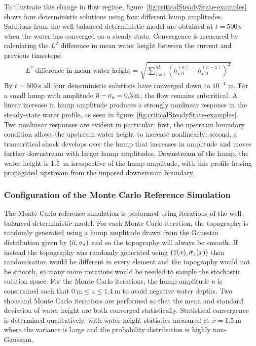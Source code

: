 To illustrate this change in flow regime, figure~\ref{fig:criticalSteadyState-examples} shows four deterministic solutions using four different hump amplitudes.
Solutions from the well-balanced deterministic model are obtained at $t = \SI{500}{\second}$ when the water has converged on a steady state.
Convergence is measured by calculating the $L^2$ difference in mean water height between the current and previous timesteps:
\begin{align}
    L^2 \text{ difference in mean water height} = \sqrt{\sum_{i=1}^M \left(h_{i,0}^{(n)} - h_{i,0}^{(n-1)}\right)^2}
\end{align}
By $t = \SI{500}{\second}$ all four deterministic solutions have converged down to $10^{-4}$ \si{\meter}.
For a small hump with amplitude $\overline{a} - \sigma_a = \SI{0.3}{\meter}$, the flow remains subcritical.
A linear increase in hump amplitude produces a strongly nonlinear response in the steady-state water profile, as seen in figure~\ref{fig:criticalSteadyState-examples}. 
Two nonlinear responses are evident in particular: first, the upstream boundary condition allows the upstream water height to increase nonlinearly; second, a transcritical shock develops over the hump that increases in amplitude and moves further downstream with larger hump amplitudes.
Downstream of the hump, the water height is \SI{1.5}{\meter} irrespective of the hump amplitude, with this profile having propagated upstream from the imposed downstream boundary.

\subsubsection{Configuration of the Monte Carlo Reference Simulation}
The Monte Carlo reference simulation is performed using iterations of the well-balanced deterministic model.
For each Monte Carlo iteration, the topography is randomly generated using a hump amplitude drawn from the Gaussian distribution given by $(\overline{a}, \sigma_a)$ and so the topography will always be smooth.
If instead the topography was randomly generated using $(\overline{z}(x), \sigma_z(x))$ then randomisation would be different in every element and the topography would not be smooth, so many more iterations would be needed to sample the stochastic solution space.
For the Monte Carlo iterations, the hump amplitude $a$ is constrained such that $\SI{0}{\meter} \leq a \leq \SI{1.4}{\meter}$ to avoid negative water depths.
Two thousand Monte Carlo iterations are performed so that the mean and standard deviation of water height are both converged statistically.
Statistical convergence is determined qualitatively, with water height statistics measured at $x = \SI{1.5}{\meter}$ where the variance is large and the probability distribution is highly non-Gaussian.

